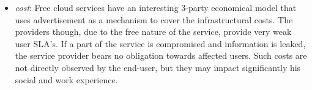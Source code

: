 \begin{itemize}
\item {\it cost}: Free cloud services have an interesting 3-party economical
      model that uses advertisement as a mechanism to cover the 
      infrastructural costs. The providers though, due to the free nature of the service,
      provide very weak user SLA's. If a part of the service is compromised and
      information is leaked, the service provider bears no obligation
      towards affected users. Such costs are not directly observed by the
      end-user, but they may impact significantly his social and work experience. 


\end{itemize}
